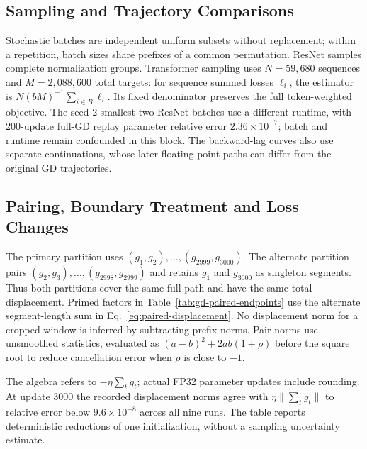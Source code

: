 \subsection{Sampling and Trajectory Comparisons}

Stochastic batches are independent uniform subsets without replacement;
within a repetition, batch sizes share prefixes of a common permutation.
ResNet samples complete normalization groups. Transformer sampling uses
$N=59{,}680$ sequences and $M=2{,}088{,}600$ total targets: for sequence
summed losses $\ell_i$, the estimator is
$N(bM)^{-1}\sum_{i\in B}\ell_i$. Its fixed denominator preserves the
full token-weighted objective. The seed-2 smallest two ResNet batches use
a different runtime, with 200-update full-GD replay parameter relative error $2.36\times10^{-7}$;
batch and runtime remain confounded in this block.
The backward-lag curves also use separate continuations, whose later
floating-point paths can differ from the original GD trajectories.

\subsection{Pairing, Boundary Treatment and Loss Changes}
\label{appendix:gd-pairing}

The primary partition uses $(g_1,g_2),\ldots,(g_{2999},g_{3000})$.
The alternate partition pairs $(g_2,g_3),\ldots,(g_{2998},g_{2999})$
and retains $g_1$ and $g_{3000}$ as singleton segments. Thus both
partitions cover the same full path and have the same total displacement.
Primed factors in Table~\ref{tab:gd-paired-endpoints} use the alternate
segment-length sum in Eq.~\eqref{eq:paired-displacement}.
No displacement norm for a cropped window is inferred by subtracting
prefix norms. Pair norms use unsmoothed statistics, evaluated as
$(a-b)^2+2ab(1+\rho)$ before the square root to reduce cancellation
error when $\rho$ is close to $-1$.

The algebra refers to $-\eta\sum_t g_t$; actual FP32 parameter
updates include rounding. At update 3000 the recorded displacement
norms agree with $\eta\|\sum_tg_t\|$ to relative error below
$9.6\times10^{-8}$ across all nine runs.
The table reports deterministic reductions of one initialization,
without a sampling uncertainty estimate.

\begin{table}[!t]
 \centering
 \caption{Pairing-offset sensitivity and cumulative-interaction references
 at $T=3000$. Primed factors retain boundary singletons after shifting
 the pairing. $R_T=C_TD_T=C_T^{\prime}D_T^{\prime}$, up to rounding.
 All nine $Q_T>1$, including the seven conditions with negative
 cumulative adjacent interaction.}
 \label{tab:gd-paired-endpoints}
 \small
 
\end{table}


